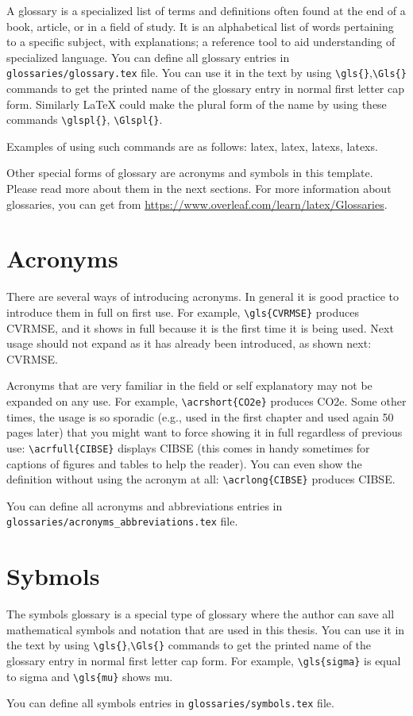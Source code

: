 A glossary is a specialized list of terms and definitions often found at the end of a book, article, 
or in a field of study. It is an alphabetical list of words pertaining to a specific subject, with explanations; 
a reference tool to aid understanding of specialized language. 
You can define all glossary entries in \verb|glossaries/glossary.tex| file. You can use it in the text by using \verb|\gls{}|,\verb|\Gls{}| commands to get the printed name of the glossary entry in normal first letter cap form.
Similarly \LaTeX{} could make the plural form of the name by using these commands \verb|\glspl{}|, \verb|\Glspl{}|.

Examples of using such commands are as follows: \gls{latex}, \Gls{latex}, \glspl{latex}, \Glspl{latex}.

Other special forms of glossary are acronyms and symbols in this template. Please read more about them in the next sections.
For more information about glossaries, you can get from \url{https://www.overleaf.com/learn/latex/Glossaries}.
\section{Acronyms}
\label{sec:Acronyms}

There are several ways of introducing acronyms. 
In general it is good practice to introduce them in full on first use. 
For example, \verb|\gls{CVRMSE}| produces \gls{CVRMSE}, and it shows in full because 
it is the first time it is being used.
Next usage should not expand as it has already been introduced, as shown next: \gls{CVRMSE}.

Acronyms that are very familiar in the field or self explanatory may not be expanded on any use.
For example, \verb|\acrshort{CO2e}| produces \acrshort{CO2e}.
Some other times, the usage is so sporadic 
(e.g., used in the first chapter and used again 50 pages later)
that you might want to force showing it in full regardless of previous use: 
\verb|\acrfull{CIBSE}| displays \acrfull{CIBSE}
(this comes in handy sometimes for captions of figures and tables to help the reader).
You can even show the definition without using the acronym at all: 
\verb|\acrlong{CIBSE}| produces \acrlong{CIBSE}.

You can define all acronyms and abbreviations entries in \verb|glossaries/acronyms_abbreviations.tex| file.

\section{Sybmols}
\label{sec:Sybmols}

The symbols glossary is a special type of glossary where the author can save all mathematical symbols and notation that are used in this thesis.  You can use it in the text by using \verb|\gls{}|,\verb|\Gls{}| commands to get the printed name of the glossary entry in normal first letter cap form. For example, \verb|\gls{sigma}| is equal to \gls{sigma} and \verb|\gls{mu}| shows \gls{mu}.

You can define all symbols entries in \verb|glossaries/symbols.tex| file.

